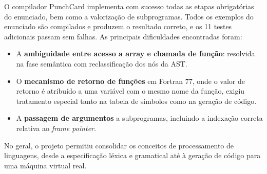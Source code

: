 \documentclass[11pt, a4paper, fleqn]{article}
\begin{document}
O compilador PunchCard implementa com sucesso todas as etapas obrigatórias do enunciado, bem como a valorização de subprogramas. Todos os exemplos do enunciado são compilados e produzem o resultado correto, e os 11 testes adicionais passam sem falhas. As principais dificuldades encontradas foram:

\begin{itemize}
    \item A \textbf{ambiguidade entre acesso a array e chamada de função}: resolvida na fase semântica com reclassificação dos nós da AST.
    \item O \textbf{mecanismo de retorno de funções} em Fortran 77, onde o valor de retorno é atribuído a uma variável com o mesmo nome da função, exigiu tratamento especial tanto na tabela de símbolos como na geração de código.
    \item A \textbf{passagem de argumentos} a subprogramas, incluindo a indexação correta relativa ao \textit{frame pointer}.
\end{itemize}

\noindent No geral, o projeto permitiu consolidar os conceitos de processamento de linguagens, desde a especificação léxica e gramatical até à geração de código para uma máquina virtual real.
\end{document}
